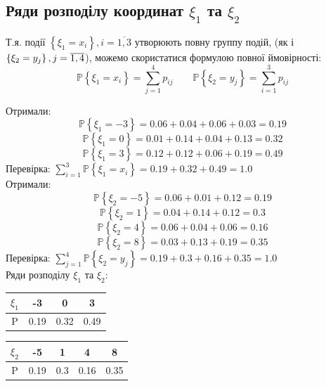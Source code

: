 \documentclass[14pt,a4paper]{scrartcl}
\theoremstyle{definition}
\theoremstyle{remark}
\theoremstyle{definition}
\theoremstyle{definition}
\begin{document}
\subsection{Ряди розподілу координат $\xi_1$ та $\xi_2$}
Т.я. події $\left\lbrace \xi_1 = x_i \right\rbrace, i = \overline{1,3}$ утворюють повну группу подій, (як і $\left\lbrace \xi_2 = y_j \right\rbrace, \\j=\overline{1,4} $), можемо скористатися формулою повної ймовірності:\\
$$\mathbb{P} \left\lbrace \xi_1  = x_i \right\rbrace =  \sum\limits_{j = 1}^{ 4}{ p_{ij}} \qquad \mathbb{P} \left\lbrace \xi_2 = y_j \right\rbrace =  \sum\limits_{i = 1}^{ 3}{ p_{ij}}$$

Отримали:
$$\mathbb{P} \left\lbrace \xi_1 =  -3  \right\rbrace =  0.06 + 0.04 + 0.06 + 0.03 = 0.19 $$
$$\mathbb{P} \left\lbrace \xi_1 =  0  \right\rbrace =  0.01 + 0.14 + 0.04 + 0.13 = 0.32 $$
$$\mathbb{P} \left\lbrace \xi_1 =  3  \right\rbrace =  0.12 + 0.12 + 0.06 + 0.19 = 0.49 $$
Перевірка: $ \sum\limits_{i = 1}^{ 3}{ \mathbb{P}\left\lbrace \xi_1 = x_i \right\rbrace} =  0.19 + 0.32 + 0.49  =  1.0 $\\
Отримали:
$$\mathbb{P} \left\lbrace \xi_2 =  -5  \right\rbrace =  0.06 + 0.01 + 0.12 = 0.19 $$
$$\mathbb{P} \left\lbrace \xi_2 =  1  \right\rbrace =  0.04 + 0.14 + 0.12 = 0.3 $$
$$\mathbb{P} \left\lbrace \xi_2 =  4  \right\rbrace =  0.06 + 0.04 + 0.06 = 0.16 $$
$$\mathbb{P} \left\lbrace \xi_2 =  8  \right\rbrace =  0.03 + 0.13 + 0.19 = 0.35 $$
Перевірка: $ \sum\limits_{j = 1}^{4}{ \mathbb{P}\left\lbrace \xi_2 = y_j \right\rbrace} =  0.19 + 0.3 + 0.16 + 0.35  =  1.0 $\\
Ряди розподілу $\xi_1$ та $\xi_2$:
\begin{center}
\begin{tabular}{|c|c|c|c|}
\hline
$\xi_1$ & -3 & 0 & 3 \\ \hline
P & 0.19 & 0.32 & 0.49 \\ \hline
\end{tabular} \qquad \qquad
\begin{tabular}{|c|c|c|c|c|}
\hline
$\xi_2$ & -5 & 1 & 4 & 8 \\ \hline
P       & 0.19  & 0.3 & 0.16 & 0.35 \\ \hline
\end{tabular}
\end{center}

\newpage
\end{document}
